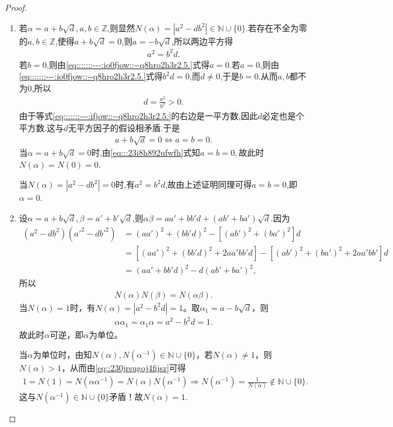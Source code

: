 \documentclass[../../main.tex]{subfiles}%
\begin{document}
\begin{proof}
\begin{enumerate}[(1)]
\item 若$\alpha = a + b\sqrt{d}, a,b \in \mathbb{Z}$,则显然$N(\alpha) = |a^2 - db^2| \in \mathbb{N} \cup \{0\}$.若存在不全为零的$a,b \in \mathbb{Z}$,使得$a + b\sqrt{d} = 0$,则$a = -b\sqrt{d}$,所以两边平方得
\begin{align}
a^2 = b^2 d.\label{eq:::::::---:io0fjow::--q8hro2h3r2.5.}
\end{align}
若$b = 0$,则由\eqref{eq:::::::---:io0fjow::--q8hro2h3r2.5.}式得$a = 0$.若$a = 0$,则由\eqref{eq:::::::---:io0fjow::--q8hro2h3r2.5.}式得$b^2 d = 0$,而$d \neq 0$,于是$b = 0$.从而$a,b$都不为0,所以
\begin{align}\label{eq:::::::---:ifjow::--q8hro2h3r2.5.}
d = \frac{a^2}{b^2} > 0.
\end{align}
由于等式\eqref{eq:::::::---:ifjow::--q8hro2h3r2.5.}的右边是一平方数,因此$d$必定也是个平方数.这与$d$无平方因子的假设相矛盾.于是\begin{align}\label{eq:::23i8h892ufwfh}
a + b\sqrt{d} = 0\iff a=b=0.
\end{align}
当$\alpha =a+b\sqrt{d}=0$时,由\eqref{eq:::23i8h892ufwfh}式知$a=b=0,$故此时$N(\alpha)=N(0) = 0$.

当$N(\alpha) = |a^2 - db^2| = 0$时,有$a^2 = b^2d$,故由上述证明同理可得$a = b = 0$,即$\alpha = 0$.

\item 设$\alpha = a + b\sqrt{d}, \beta = a' + b'\sqrt{d}$,则$\alpha\beta = aa' + bb'd + (ab' + ba')\sqrt{d}$.因为
\begin{align*}
(a^2 - db^2)(a'^2 - db'^2) &= (aa')^2 + (bb'd)^2 - [(ab')^2 + (ba')^2]d \\
&= [(aa')^2 + (bb'd)^2 + 2aa'bb'd] - [(ab')^2 + (ba')^2 + 2aa'bb']d \\
&= (aa' + bb'd)^2 - d(ab' + ba')^2,
\end{align*}
所以
\begin{align}\label{eq::230jrsugoj4fijsz}
N(\alpha)N(\beta) = N(\alpha\beta).
\end{align}
当$N(\alpha)=1$时，有$N(\alpha)=|a^2-b^2d|=1$。取$\alpha_1=a-b\sqrt{d}$，则
\begin{align*}
\alpha\alpha_1=\alpha_1\alpha=a^2-b^2d=1.
\end{align*}
故此时$\alpha$可逆，即$\alpha$为单位。

当$\alpha$为单位时，由知$N(\alpha),N(\alpha^{-1})\in\mathbb{N}\cup\{0\}$，若$N(\alpha)\neq1$，则$N(\alpha)>1$，从而由\eqref{eq::230jrsugoj4fijsz}可得
\begin{align*}
1=N(1)=N(\alpha\alpha^{-1})=N(\alpha)N(\alpha^{-1})\Longrightarrow N(\alpha^{-1})=\frac{1}{N(\alpha)}\notin\mathbb{N}\cup\{0\}.
\end{align*}
这与$N(\alpha^{-1})\in\mathbb{N}\cup\{0\}$矛盾！故$N(\alpha)=1$.


\end{enumerate}
\end{proof}
\end{document}

